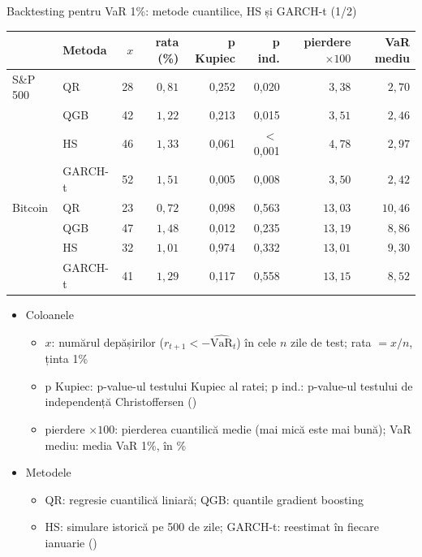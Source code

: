 \begin{frame}{Backtesting pentru VaR 1\%: metode cuantilice, HS și GARCH-t (1/2)}
\itemsize{\footnotesize}
\begin{center}
\scriptsize
\begin{tabular}{llrrrrrr}
\toprule
& Metoda & $x$ & rata (\%) & p Kupiec & p ind. & pierdere $\times 100$ & VaR mediu \\
\midrule
S\&P 500 & QR & 28 & $0{,}81$ & 0{,}252 & 0{,}020 & $3{,}38$ & $2{,}70$ \\
 & QGB & 42 & $1{,}22$ & 0{,}213 & 0{,}015 & $3{,}51$ & $2{,}46$ \\
 & HS & 46 & $1{,}33$ & 0{,}061 & $<$\,0{,}001 & $4{,}78$ & $2{,}97$ \\
 & GARCH-t & 52 & $1{,}51$ & 0{,}005 & 0{,}008 & $3{,}50$ & $2{,}42$ \\
\midrule
Bitcoin & QR & 23 & $0{,}72$ & 0{,}098 & 0{,}563 & $13{,}03$ & $10{,}46$ \\
 & QGB & 47 & $1{,}48$ & 0{,}012 & 0{,}235 & $13{,}19$ & $8{,}86$ \\
 & HS & 32 & $1{,}01$ & 0{,}974 & 0{,}332 & $13{,}01$ & $9{,}30$ \\
 & GARCH-t & 41 & $1{,}29$ & 0{,}117 & 0{,}558 & $13{,}15$ & $8{,}52$ \\
\bottomrule
\end{tabular}
\end{center}
\begin{itemize}
    \item Coloanele
    \begin{itemize}
        \item $x$: numărul depășirilor ($r_{t+1} < -\widehat{\mathrm{VaR}}_t$) în cele $n$ zile de test; rata $= x/n$, ținta 1\%
        \item p Kupiec: p-value-ul testului Kupiec al ratei; p ind.: p-value-ul testului de independență Christoffersen ()
        \item pierdere $\times 100$: pierderea cuantilică medie (mai mică este mai bună); VaR mediu: media VaR 1\%, în \%
    \end{itemize}
    \item Metodele
    \begin{itemize}
        \item QR: regresie cuantilică liniară; QGB: quantile gradient boosting
        \item HS: simulare istorică pe 500 de zile; GARCH-t: reestimat în fiecare ianuarie ()
    \end{itemize}
\end{itemize}
\end{frame}

